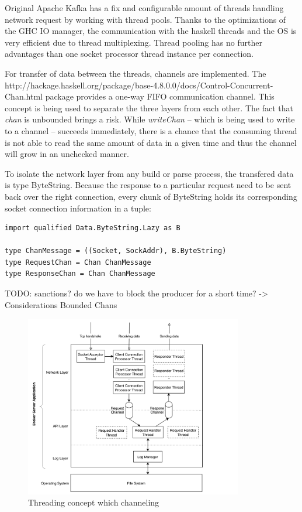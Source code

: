 Original Apache Kafka has a fix and configurable amount of threads
handling network request by working with thread pools. Thanks to the
optimizations of the GHC IO manager, the communication with the haskell threads
and the OS is very efficient due to thread multiplexing. Thread pooling has no
further advantages than one socket processor thread instance per connection. 

For transfer of data between the threads, channels are implemented. The 
{http://hackage.haskell.org/package/base-4.8.0.0/docs/Control-Concurrent-Chan.html}
package provides a one-way FIFO communication channel. This concept
is being used to separate the three layers from each other. The
fact that \textit{chan} is unbounded brings a risk. While \textit{writeChan} --
which is being used to write to a channel -- succeeds immediately, there is a
chance that the consuming thread is not able to read the same amount of data in
a given time and thus the channel will grow in an unchecked manner.
\cite{o2008real}

To isolate the network layer from any build or parse process, the transfered
data is type ByteString. Because the response to a particular request need to be
sent back over the right connection, every chunk of ByteString holds its corresponding
socket connection information in a tuple:

\begin{lstlisting}
import qualified Data.ByteString.Lazy as B

type ChanMessage = ((Socket, SockAddr), B.ByteString)
type RequestChan = Chan ChanMessage
type ResponseChan = Chan ChanMessage
\end{lstlisting}

TODO: sanctions? do we have to block the producer for a short time? ->
Considerations Bounded Chans

\begin{figure}[H]
    \centering
    \includegraphics[width=0.85\textwidth]{images/impl-brok-threading.png}
    \caption{Threading concept which channeling}
    \label{fig:impl-brok-threading}
\end{figure}

